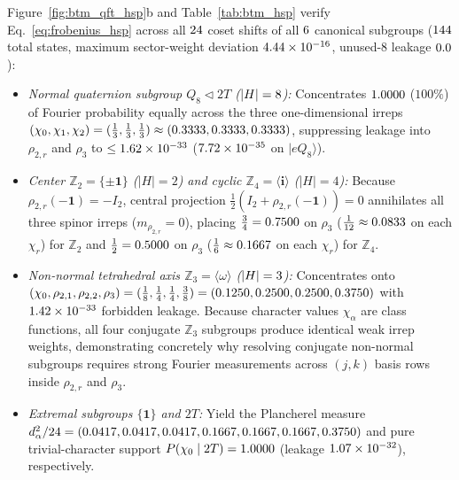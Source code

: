 \documentclass[aps,prx,twocolumn,superscriptaddress,nofootinbib]{revtex4-2}
\begin{document}
Figure~\ref{fig:btm_qft_hsp}b and Table~\ref{tab:btm_hsp} verify Eq.~\eqref{eq:frobenius_hsp} across all $24$ coset shifts of all $6$ canonical subgroups ($144$ total states, maximum sector-weight deviation $4.44 \times 10^{-16}$, unused-$8$ leakage $0.0$):
\begin{itemize}
  \item \emph{Normal quaternion subgroup $Q_8 \triangleleft 2T$ ($|H|=8$):} Concentrates $1.0000$ ($100\%$) of Fourier probability equally across the three one-dimensional irreps $(\chi_0,\chi_1,\chi_2) = (\tfrac{1}{3},\tfrac{1}{3},\tfrac{1}{3}) \approx (0.3333,0.3333,0.3333)$, suppressing leakage into $\rho_{2,r}$ and $\rho_3$ to $\le 1.62 \times 10^{-33}$ ($7.72 \times 10^{-35}$ on $|e Q_8\rangle$).
  \item \emph{Center $\mathbb{Z}_2 = \{\pm\mathbf{1}\}$ ($|H|=2$) and cyclic $\mathbb{Z}_4 = \langle\mathbf{i}\rangle$ ($|H|=4$):} Because $\rho_{2,r}(-\mathbf{1}) = -I_2$, central projection $\tfrac{1}{2}(I_2 + \rho_{2,r}(-\mathbf{1})) = 0$ annihilates all three spinor irreps ($m_{\rho_{2,r}} = 0$), placing $\tfrac{3}{4} = 0.7500$ on $\rho_3$ ($\tfrac{1}{12} \approx 0.0833$ on each $\chi_r$) for $\mathbb{Z}_2$ and $\tfrac{1}{2} = 0.5000$ on $\rho_3$ ($\tfrac{1}{6} \approx 0.1667$ on each $\chi_r$) for $\mathbb{Z}_4$.
  \item \emph{Non-normal tetrahedral axis $\mathbb{Z}_3 = \langle\omega\rangle$ ($|H|=3$):} Concentrates onto $(\chi_0, \rho_{2,1}, \rho_{2,2}, \rho_3) = (\tfrac{1}{8}, \tfrac{1}{4}, \tfrac{1}{4}, \tfrac{3}{8}) = (0.1250, 0.2500, 0.2500, 0.3750)$ with $1.42 \times 10^{-33}$ forbidden leakage. Because character values $\chi_\alpha$ are class functions, all four conjugate $\mathbb{Z}_3$ subgroups produce identical weak irrep weights, demonstrating concretely why resolving conjugate non-normal subgroups requires strong Fourier measurements across $(j,k)$ basis rows inside $\rho_{2,r}$ and $\rho_3$.
  \item \emph{Extremal subgroups $\{\mathbf{1}\}$ and $2T$:} Yield the Plancherel measure $d_\alpha^2/24 = (0.0417, 0.0417, 0.0417, 0.1667, 0.1667, 0.1667, 0.3750)$ and pure trivial-character support $P(\chi_0 \mid 2T) = 1.0000$ (leakage $1.07 \times 10^{-32}$), respectively.
\end{itemize}
\end{document}
